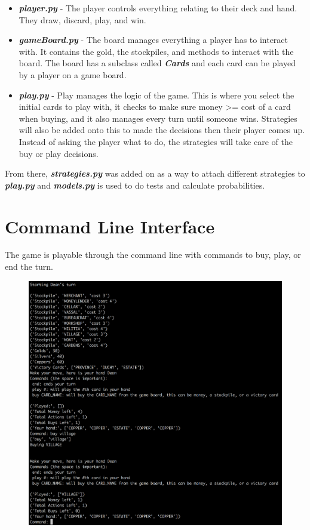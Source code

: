 \documentclass[11pt, oneside]{article}   	%
\begin{document}
	\begin{itemize}
  		\item \textbf{\textit{player.py}} - The player controls everything relating to their deck and hand. They draw, discard, play, and win. 
  		\item \textbf{\textit{gameBoard.py}} - The board manages everything a player has to interact with. It contains the gold, the stockpiles, and methods to interact with the board. The board has a subclass called \textbf{\textit{Cards}} and each card can be played by a player on a game board. 
		\item \textbf{\textit{play.py}} - Play manages the logic of the game. This is where you select the initial cards to play with, it checks to make sure money >= cost of a card when buying, and it also manages every turn until someone wins.  Strategies will also be added onto this to made the decisions then their player comes up. Instead of asking the player what to do, the strategies will take care of the buy or play decisions. 
	\end{itemize}
	
From there, \textbf{\textit{strategies.py}} was added on as a way to attach different strategies to \textbf{\textit{play.py}} and \textbf{\textit{models.py}} is used to do tests and calculate probabilities. 

\section{Command Line Interface}

The game is playable through the command line with commands to buy, play, or end the turn. 

\begin{figure}[H]
\hspace*{-1.3in}
\includegraphics[width=1.5\textwidth]{commandLine}
\centering
\end{figure}
\end{document}
